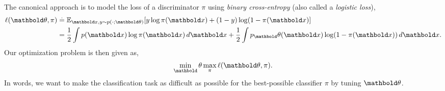 \documentclass{tufte-handout}
\begin{document}
The canonical approach is to model the loss of a discriminator $\pi$ using \emph{binary cross-entropy} (also called a \emph{logistic loss}), \begin{align}
    \ell(\vtheta, \pi) &\defeq \E[\vx, y \sim p(\cdot; \vtheta)]{y \log \pi(\vx) + (1-y) \log (1 - \pi(\vx)} \\
    &= \frac{1}{2} \int p(\vx) \log \pi(\vx) \,d\vx + \frac{1}{2} \int p_\vtheta(\vx) \log(1 - \pi(\vx)) \,d\vx.
\end{align} Our optimization problem is then given as, \begin{align}
    \min_\vtheta \max_\pi \ell(\vtheta, \pi).
\end{align} In words, we want to make the classification task as difficult as possible for the best-possible classifier $\pi$ by tuning $\vtheta$.
\end{document}
